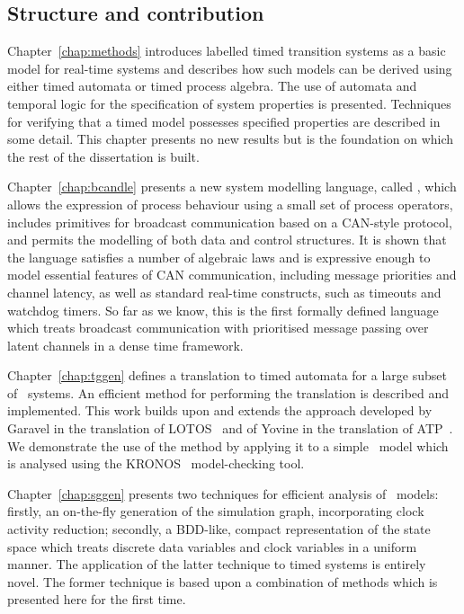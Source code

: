 \subsection{Structure and contribution}
Chapter~\ref{chap:methods} introduces labelled timed transition
systems as a basic model for real-time systems and describes how
such models can be derived using either timed automata or timed
process algebra.  The use of automata and temporal logic for
the specification of system properties is presented. Techniques for 
verifying that a timed model possesses specified properties are
described in some detail. This chapter presents no new results but is the
foundation on which the rest of the dissertation is built. 
 
Chapter~\ref{chap:bcandle} presents a new system modelling language,
called \bcandle, which allows the expression of process behaviour using a
small set of process operators, includes primitives for broadcast
communication based on a CAN-style protocol, and permits the modelling
of both data and control structures. It is shown that the language
satisfies a number of algebraic laws and is expressive enough to model
essential features of CAN communication, including message priorities
and channel latency, as well as standard real-time constructs, such as
timeouts and watchdog timers. So far as we know, this is the first
formally defined language which treats broadcast communication with 
prioritised message passing over latent channels in a dense time 
framework.

Chapter~\ref{chap:tggen} defines a translation to timed automata for a
large subset of \bcandle\ systems. An efficient method for
performing the translation is described and implemented. This work
builds upon and extends the approach developed by Garavel in the
translation of LOTOS~\cite{gar:92} and of Yovine in the translation of
ATP~\cite{yov:93}. We demonstrate the use of the method by applying it
to a simple \bcandle\ model which is analysed using the
KRONOS~\cite{bdm:98} model-checking tool.

Chapter~\ref{chap:sggen} presents two techniques for efficient analysis
of \bcandle\ models: firstly, an on-the-fly generation of the
simulation graph, incorporating clock activity reduction; secondly, a
BDD-like, compact representation of the state space which treats discrete
data variables and clock variables in a uniform manner. The application 
of the latter technique to timed systems is entirely novel. The former
technique is based upon a combination of methods which is presented here
for the first time.  

